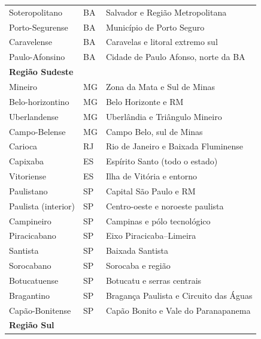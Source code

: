 \begin{table}[ht]
\begin{tabular}{lll}
Soteropolitano  & BA & Salvador e Região Metropolitana         \\
Porto-Segurense & BA & Município de Porto Seguro               \\
Caravelense     & BA & Caravelas e litoral extremo sul         \\
Paulo-Afonsino  & BA & Cidade de Paulo Afonso, norte da BA     \\
\hline
\multicolumn{3}{l}{\textbf{Região Sudeste}} \\ \hline
Mineiro           & MG                     & Zona da Mata e Sul de Minas           \\
Belo-horizontino  & MG                     & Belo Horizonte e RM                   \\
Uberlandense      & MG                     & Uberlândia e Triângulo Mineiro        \\
Campo-Belense     & MG                     & Campo Belo, sul de Minas              \\
Carioca           & RJ                     & Rio de Janeiro e Baixada Fluminense   \\
Capixaba          & ES                     & Espírito Santo (todo o estado)        \\
Vitoriense        & ES                     & Ilha de Vitória e entorno             \\
Paulistano        & SP                     & Capital São Paulo e RM                \\
Paulista (interior)& SP                    & Centro-oeste e noroeste paulista      \\
Campineiro        & SP                     & Campinas e pólo tecnológico           \\
Piracicabano      & SP                     & Eixo Piracicaba–Limeira               \\
Santista          & SP                     & Baixada Santista                      \\
Sorocabano        & SP                     & Sorocaba e região                     \\
Botucatuense      & SP                     & Botucatu e serras centrais           \\
Bragantino        & SP                     & Bragança Paulista e Circuito das Águas\\
Capão-Bonitense   & SP                     & Capão Bonito e Vale do Paranapanema   \\
\hline
\multicolumn{3}{l}{\textbf{Região Sul}} \\ \hline

\end{tabular}
\end{table}

